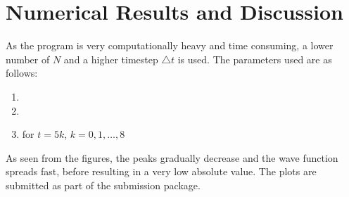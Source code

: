 \documentclass[a4paper,8pt]{article}
\begin{document}
\newpage

\section{Numerical Results and Discussion}

As the program is very computationally heavy and time consuming, a lower number of $N$ and a higher timestep $\triangle t$ is used. The parameters used are as follows:
\begin{enumerate}[label=\arabic*.]
\setlength{\itemsep}{0pt}
\item {}
\item {}
\item {} for $t=5k$, $k = 0, 1, \ldots, 8$
\end{enumerate}

As seen from the figures, the peaks gradually decrease and the wave function spreads fast, before resulting in a very low absolute value. The plots are submitted as part of the submission package.
\end{document}
